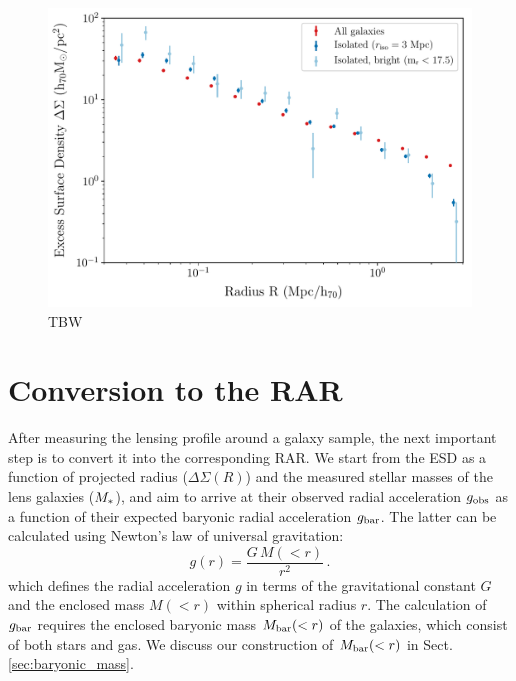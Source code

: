 \documentclass[usenatbib]{mnras}
\newcommand{\un}[1]{_{\rm #1}}
\begin{document}
\begin{figure}
	\includegraphics[width=1.0\columnwidth]{Figures/ESD_KiDS_isotest.pdf}
	\caption{TBW}
	\label{fig:isolation_test_ESD}
\end{figure}



\section{Conversion to  the RAR}
\label{sec:conversion}

After measuring the lensing profile around a galaxy sample, the next important step is to convert it into the corresponding RAR. We start from the ESD as a function of projected radius ($\Delta\Sigma(R)$) and the measured stellar masses of the lens galaxies ($M\un{*}$), and aim to arrive at their observed radial acceleration $g\un{obs}$ as a function of their expected baryonic radial acceleration $g\un{bar}$. The latter can be calculated using Newton's law of universal gravitation:
\begin{equation}\label{eq:grav}
g(r) = \frac{G \, M(<r)}{r^2} \, .
\end{equation}
which defines the radial acceleration $g$ in terms of the gravitational constant $G$ and the enclosed mass $M(<r)$ within spherical radius $r$. The calculation of  $g\un{bar}$ requires the enclosed baryonic mass $M\un{bar}(<r)$ of the galaxies, which consist of both stars and gas. We discuss our construction of $M\un{bar}(<r)$ in Sect. \ref{sec:baryonic_mass}.
\end{document}
